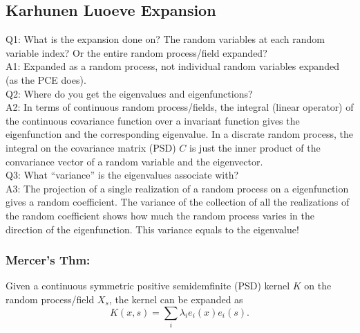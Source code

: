 \subsection{Karhunen Luoeve Expansion} 
    Q1: What is the expansion done on? The random variables at each random variable index? Or the entire random process/field expanded? \\ 
    A1: Expanded as a random process, not individual random variables expanded (as the PCE does). \\ 
    Q2: Where do you get the eigenvalues and eigenfunctions? \\ 
    A2: In terms of continuous random process/fields, the integral (linear operator) of 
        the continuous covariance function over a invariant function gives the eigenfunction and the corresponding eigenvalue.  
        In a discrate random process, the integral on the covariance matrix (PSD) $C$ is 
        just the inner product of the convariance vector of a random variable and the eigenvector. \\ 
    Q3: What ``variance'' is the eigenvalues associate with? \\ 
    A3: The projection of a single realization of a random process on a eigenfunction gives a random coefficient.  
        The variance of the collection of all the realizations of the random coefficient shows how much the random process varies in the direction of the eigenfunction.  
        This variance equals to the eigenvalue!
    

\subsubsection{\bf Mercer's Thm:}  Given a continuous symmetric positive semidemfinite (PSD) kernel $K$ on the random process/field $X_s$, the kernel can be expanded as 
    \begin{equation} 
        K(x,s) = \sum_i \lambda_i e_i(x) e_i(s).  
    \end{equation}

